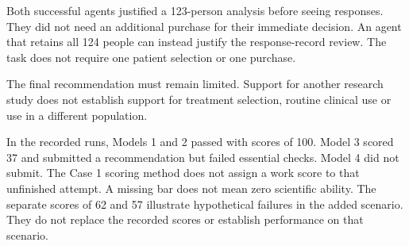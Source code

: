Both successful agents justified a 123-person analysis before seeing responses. They did not need an additional purchase for their immediate decision. An agent that retains all 124 people can instead justify the response-record review. The task does not require one patient selection or one purchase.

The final recommendation must remain limited. Support for another research study does not establish support for treatment selection, routine clinical use or use in a different population.

\newpage
{}
\begin{center}
\end{center}

In the recorded runs, Models 1 and 2 passed with scores of 100. Model 3 scored 37 and submitted a recommendation but failed essential checks. Model 4 did not submit. The Case 1 scoring method does not assign a work score to that unfinished attempt. A missing bar does not mean zero scientific ability. The separate scores of 62 and 57 illustrate hypothetical failures in the added scenario. They do not replace the recorded scores or establish performance on that scenario.

